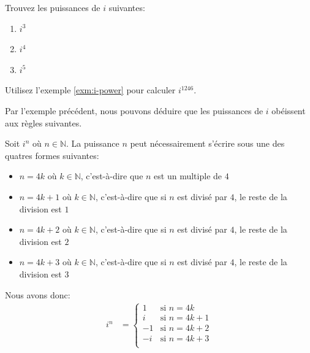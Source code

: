 \documentclass[]{book}
\providecommand{\tightlist}{%
  \setlength{\itemsep}{0pt}\setlength{\parskip}{0pt}}
\theoremstyle{definition}
\theoremstyle{definition}
\theoremstyle{definition}
\theoremstyle{remark}
\let\BeginKnitrBlock\begin \let\EndKnitrBlock\end
\begin{document}
\BeginKnitrBlock{example}
\protect\hypertarget{exm:i-power}{}{\label{exm:i-power} }Trouvez les puissances de \(i\) suivantes:

\begin{enumerate}
\def\labelenumi{\alph{enumi}.}
\tightlist
\item
  \(i^3\)
\item
  \(i^4\)
\item
  \(i^5\)
\end{enumerate}
\EndKnitrBlock{example}

\BeginKnitrBlock{example}
\protect\hypertarget{exm:unnamed-chunk-141}{}{\label{exm:unnamed-chunk-141} }Utilisez l'exemple \ref{exm:i-power} pour calculer \(i^{1246}\).
\EndKnitrBlock{example}

Par l'exemple précédent, nous pouvons déduire que les puissances de \(i\) obéissent aux règles suivantes.

\BeginKnitrBlock{theorem}[Les puissances de $i$]
\protect\hypertarget{thm:i-puissance}{}{\label{thm:i-puissance} {} }Soit \(i^n\) où \(n\in\mathbb{N}\). La puissance \(n\) peut nécessairement s'écrire sous une des quatres formes suivantes:

\begin{itemize}
\tightlist
\item
  \(n=4k\) où \(k\in\mathbb{N}\), c'est-à-dire que \(n\) est un multiple de \(4\)
\item
  \(n=4k+1\) où \(k\in\mathbb{N}\), c'est-à-dire que si \(n\) est divisé par \(4\), le reste de la division est \(1\)
\item
  \(n=4k+2\) où \(k\in\mathbb{N}\), c'est-à-dire que si \(n\) est divisé par \(4\), le reste de la division est \(2\)
\item
  \(n=4k+3\) où \(k\in\mathbb{N}\), c'est-à-dire que si \(n\) est divisé par \(4\), le reste de la division est \(3\)
\end{itemize}

Nous avons donc:
\begin{align*}
i^n &= \begin{cases}
1 & \text{si } n=4k \\
i & \text{si } n=4k+1 \\
-1 & \text{si } n=4k+2 \\
-i & \text{si } n=4k+3 \\
\end{cases}
\end{align*}
\EndKnitrBlock{theorem}
\end{document}
